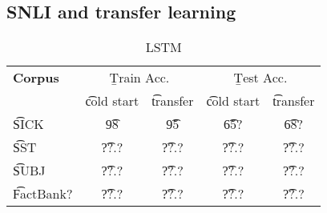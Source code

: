 \subsection{SNLI and transfer learning}

\begin{table}
\begin{center}
\begin{tabular}{l@{\hskip \colspaceL}c@{\hskip \colspaceS}c@{\hskip \colspaceS}c@{\hskip \colspaceS}c}
\hline
\textbf{Corpus} & \multicolumn{2}{c}{\b{Train Acc.}} &\multicolumn{2}{c}{ \b{Test Acc.}} \\
 & \t{cold start} & \t{transfer} & \t{cold start} & \t{transfer}  \\
\hline
\t{SICK}            & \t{98} & \t{95} & \t{65?} & \t{68?}  \\
\t{SST}          & \t{??.?} & \t{??.?} & \t{??.?} & \t{??.?} \\
\t{SUBJ}          & \t{??.?} & \t{??.?} & \t{??.?} & \t{??.?} \\
\t{FactBank?}          & \t{??.?} & \t{??.?} & \t{??.?} & \t{??.?} \\
\hline
\end{tabular}
\end{center}
\caption{
\label{tab:transferresults}
LSTM
}
\end{table}